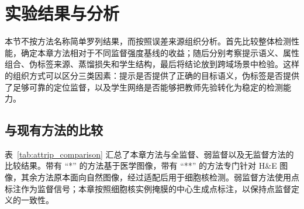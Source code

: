 \section{实验结果与分析}

本节不按方法名称简单罗列结果，而按照误差来源组织分析。首先比较整体检测性能，确定本章方法相对于不同监督强度基线的收益；随后分别考察提示语义、属性组合、伪标签来源、蒸馏损失和学生结构，最后将结论放到跨域场景中检验。这样的组织方式可以区分三类因素：提示是否提供了正确的目标语义，伪标签是否提供了足够可靠的定位监督，以及学生网络是否能够把教师先验转化为稳定的检测能力。

\subsection{与现有方法的比较}

表~\ref{tab:attrip_comparison} 汇总了本章方法与全监督、弱监督以及无监督方法的比较结果。带有 ``*'' 的方法基于医学图像，带有 ``**'' 的方法专门针对 H\&E 图像，其余方法原本面向自然图像，经过适配后用于细胞核检测。弱监督方法使用点标注作为监督信号；本章按照细胞核实例掩膜的中心生成点标注，以保持点监督定义的一致性。


